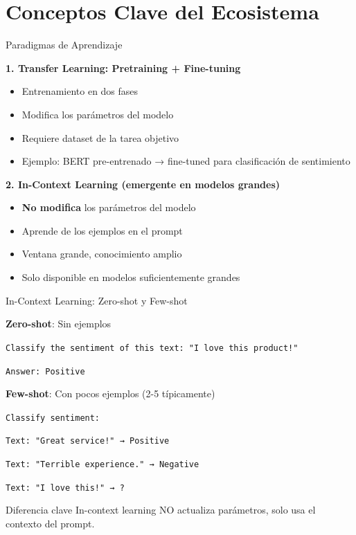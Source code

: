 \section{Conceptos Clave del Ecosistema}



\begin{frame}{Paradigmas de Aprendizaje}

\textbf{1. Transfer Learning: Pretraining + Fine-tuning}
\begin{itemize}
    \item Entrenamiento en dos fases
    \item Modifica los parámetros del modelo
    \item Requiere dataset de la tarea objetivo
    \item Ejemplo: BERT pre-entrenado → fine-tuned para clasificación de sentimiento
\end{itemize}

\vspace{0.5em}

\textbf{2. In-Context Learning (emergente en modelos grandes)}
\begin{itemize}
    \item \textbf{No modifica} los parámetros del modelo
    \item Aprende de los ejemplos en el prompt
    \item Ventana grande, conocimiento amplio
    \item Solo disponible en modelos suficientemente grandes
\end{itemize}

\end{frame}

\begin{frame}{In-Context Learning: Zero-shot y Few-shot}

\textbf{Zero-shot}: Sin ejemplos
\begin{block}{}
\small
\texttt{Classify the sentiment of this text: "I love this product!"}

\texttt{Answer: Positive}
\end{block}

\vspace{0.5em}

\textbf{Few-shot}: Con pocos ejemplos (2-5 típicamente)
\begin{block}{}
\small
\texttt{Classify sentiment:}

\texttt{Text: "Great service!" → Positive}

\texttt{Text: "Terrible experience." → Negative}

\texttt{Text: "I love this!" → ?}
\end{block}

\vspace{0.5em}

\begin{alertblock}{Diferencia clave}
In-context learning NO actualiza parámetros, solo usa el contexto del prompt.
\end{alertblock}

\end{frame}

